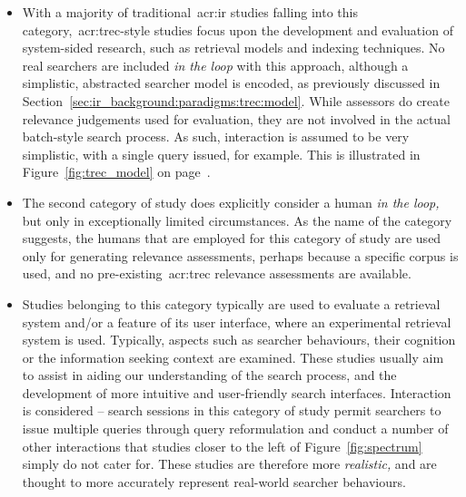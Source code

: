 \begin{itemize}
        \item[]{\hspace{-6mm} With a majority of traditional~\gls{acr:ir} studies falling into this category,~\gls{acr:trec}-style studies focus upon the development and evaluation of system-sided research, such as retrieval models and indexing techniques. No real searchers are included \emph{in the loop} with this approach, although a simplistic, abstracted searcher model is encoded, as previously discussed in Section~\ref{sec:ir_background:paradigms:trec:model}. While assessors do create relevance judgements used for evaluation, they are not involved in the actual batch-style search process. As such, interaction is assumed to be very simplistic, with a single query issued, for example. This is illustrated in Figure~\ref{fig:trec_model} on page~\pageref{fig:trec_model}.}
    \item[]{\hspace{-6mm} The second category of study does explicitly consider a human \emph{in the loop,} but only in exceptionally limited circumstances. As the name of the category suggests, the humans that are employed for this category of study are used only for generating relevance assessments, perhaps because a specific corpus is used, and no pre-existing~\gls{acr:trec} relevance assessments are available.}
    \item[]{\hspace{-6mm}  Studies belonging to this category typically are used to evaluate a retrieval system and/or a feature of its user interface, where an experimental retrieval system is used. Typically, aspects such as searcher behaviours, their cognition or the information seeking context are examined. These studies usually aim to assist in aiding our understanding of the search process, and the development of more intuitive and user-friendly search interfaces. Interaction is considered -- search sessions in this category of study permit searchers to issue multiple queries through query reformulation and conduct a number of other interactions that studies closer to the left of Figure~\ref{fig:spectrum} simply do not cater for. These studies are therefore more \emph{realistic,} and are thought to more accurately represent real-world searcher behaviours.}
    

\end{itemize}
